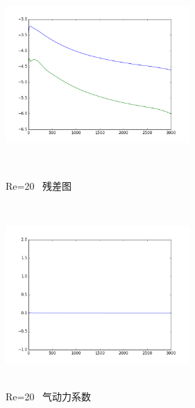 \documentclass[UTF8]{ctexart}
\begin{document}
\begin{figure}[htbp]
\begin{minipage}{7cm}
\includegraphics[height=7cm,width=7cm]{../pic/Residue_20.png}
\caption{Re=20 \ 残差图}
\end{minipage}
\begin{minipage}{7cm}
\includegraphics[height=7cm,width=7cm]{../pic/Aerodynamics_20.png}
\caption{Re=20 \ 气动力系数}
\end{minipage}
\end{figure}
\clearpage
\end{document}
